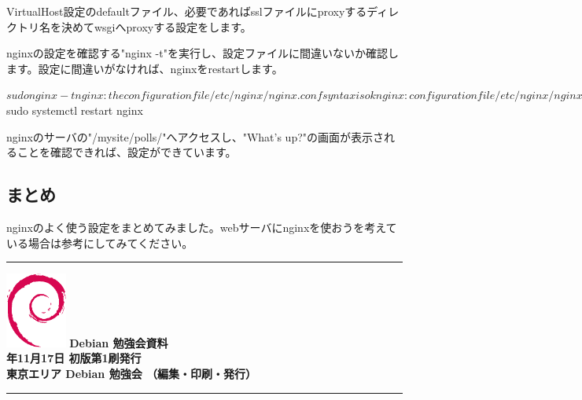 \documentclass[mingoth,a4paper]{jsarticle}
\newcommand{\debmtgyear}{2018}
\newcommand{\debmtgmonth}{11}
\newcommand{\debmtgdate}{17}
\begin{document}
VirtualHost設定のdefaultファイル、必要であればsslファイルにproxyするディレクトリ名を決めてwsgiへproxyする設定をします。


nginxの設定を確認する"nginx -t"を実行し、設定ファイルに間違いないか確認します。設定に間違いがなければ、nginxをrestartします。

\begin{commandline}
$ sudo nginx -t
nginx: the configuration file /etc/nginx/nginx.conf syntax is ok
nginx: configuration file /etc/nginx/nginx.conf test is successful

$ sudo systemctl restart nginx
\end{commandline}

nginxのサーバの"/mysite/polls/"へアクセスし、"What's up?"の画面が表示されることを確認できれば、設定ができています。

\subsection{まとめ}

nginxのよく使う設定をまとめてみました。webサーバにnginxを使おうを考えている場合は参考にしてみてください。

%
\mbox{}\newpage
\mbox{}\newpage
\mbox{}\newpage

\vspace*{15cm}
\hrule
\vspace{2mm}
\includegraphics[width=2cm]{image200502/openlogo-nd.eps}
\noindent \Large \bf Debian 勉強会資料\\
\noindent \normalfont \debmtgyear{}年\debmtgmonth{}月\debmtgdate{}日 \hspace{5mm}  初版第1刷発行\\
\noindent \normalfont 東京エリア Debian 勉強会 （編集・印刷・発行）\\
\hrule
\end{document}
